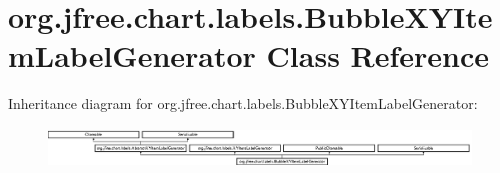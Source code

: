 \hypertarget{classorg_1_1jfree_1_1chart_1_1labels_1_1_bubble_x_y_item_label_generator}{}\section{org.\+jfree.\+chart.\+labels.\+Bubble\+X\+Y\+Item\+Label\+Generator Class Reference}
\label{classorg_1_1jfree_1_1chart_1_1labels_1_1_bubble_x_y_item_label_generator}
Inheritance diagram for org.\+jfree.\+chart.\+labels.\+Bubble\+X\+Y\+Item\+Label\+Generator\+:\begin{figure}[H]
\begin{center}
\leavevmode
\includegraphics[height=1.056604cm]{classorg_1_1jfree_1_1chart_1_1labels_1_1_bubble_x_y_item_label_generator}
\end{center}
\end{figure}
